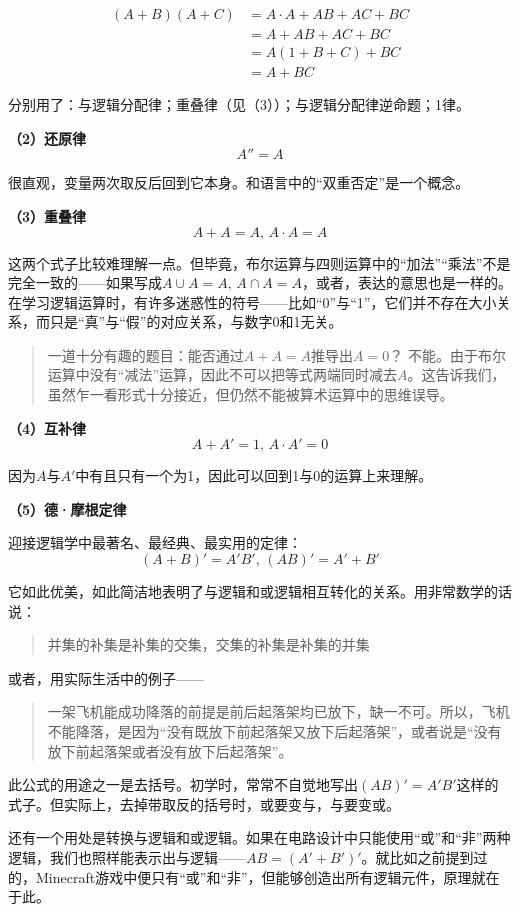\documentclass[UTF8]{ctexart}
\begin{document}
\begin{equation*}
\begin{aligned}
(A+B)(A+C)&=A\cdot A+AB+AC+BC\\ 
&=A+AB+AC+BC\\ 
&=A(1+B+C)+BC\\ 
&=A+BC
\end{aligned}
\end{equation*}

分别用了：与逻辑分配律；重叠律（见（3））；与逻辑分配律逆命题；1律。

\textbf{（2）还原律}
\[A''=A\]

很直观，变量两次取反后回到它本身。和语言中的“双重否定”是一个概念。

\textbf{（3）重叠律}
\[A+A=A,\,A\cdot A=A\]

这两个式子比较难理解一点。但毕竟，布尔运算与四则运算中的“加法”“乘法”不是完全一致的——如果写成$A\cup A=A,\,A\cap A=A$，或者，表达的意思也是一样的。在学习逻辑运算时，有许多迷惑性的符号——比如“0”与“1”，它们并不存在大小关系，而只是“真”与“假”的对应关系，与数字0和1无关。
\begin{quote}
一道十分有趣的题目：能否通过$A + A = A$推导出$A = 0$？
不能。由于布尔运算中没有“减法”运算，因此不可以把等式两端同时减去$A$。这告诉我们，虽然乍一看形式十分接近，但仍然不能被算术运算中的思维误导。
\end{quote}
\textbf{（4）互补律}
\[A+A'=1,\,A\cdot A'=0\]

因为$A$与$A'$中有且只有一个为1，因此可以回到1与0的运算上来理解。

\textbf{（5）德·摩根定律}

迎接逻辑学中最著名、最经典、最实用的定律：
\[(A+B)'=A'B',\,(AB)'=A'+B'\]

它如此优美，如此简洁地表明了与逻辑和或逻辑相互转化的关系。用非常数学的话说：
\begin{quote}
并集的补集是补集的交集，交集的补集是补集的并集
\end{quote}
或者，用实际生活中的例子——
\begin{quote}
一架飞机能成功降落的前提是前后起落架均已放下，缺一不可。所以，飞机不能降落，是因为“没有既放下前起落架又放下后起落架”，或者说是“没有放下前起落架或者没有放下后起落架”。
\end{quote}
此公式的用途之一是去括号。初学时，常常不自觉地写出$(AB)'=A'B'$这样的式子。但实际上，去掉带取反的括号时，或要变与，与要变或。

还有一个用处是转换与逻辑和或逻辑。如果在电路设计中只能使用“或”和“非”两种逻辑，我们也照样能表示出与逻辑——$AB=(A'+B')'$。就比如之前提到过的，Minecraft游戏中便只有“或”和“非”，但能够创造出所有逻辑元件，原理就在于此。
\end{document}
